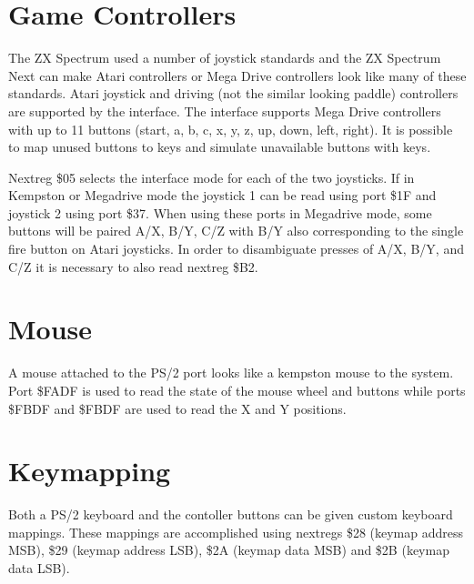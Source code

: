










\section{Game Controllers}

The ZX Spectrum used a number of joystick standards and the ZX
Spectrum Next can make Atari controllers or Mega Drive controllers
look like many of these standards. Atari joystick and driving (not the
similar looking paddle) controllers are supported by the
interface. The interface supports Mega Drive controllers with up to 11
buttons (start, a, b, c, x, y, z, up, down, left, right). It is
possible to map unused buttons to keys and simulate unavailable
buttons with keys.

Nextreg \$05 selects the interface mode for each of the two
joysticks. If in Kempston or Megadrive mode the joystick 1 can be read
using port \$1F and joystick 2 using port \$37. When using these ports
in Megadrive mode, some buttons will be paired A/X, B/Y, C/Z with B/Y
also corresponding to the single fire button on Atari joysticks. In
order to disambiguate presses of A/X, B/Y, and C/Z it is necessary to
also read nextreg \$B2.






\section{Mouse}

A mouse attached to the PS/2 port looks like a kempston mouse to the
system. Port \$FADF is used to read the state of the mouse wheel and
buttons while ports \$FBDF and \$FBDF are used to read the X and Y
positions.





\section{Keymapping}

Both a PS/2 keyboard and the contoller buttons can be given custom
keyboard mappings. These mappings are accomplished using nextregs \$28
(keymap address MSB), \$29 (keymap address LSB), \$2A (keymap data
MSB) and \$2B (keymap data LSB).

